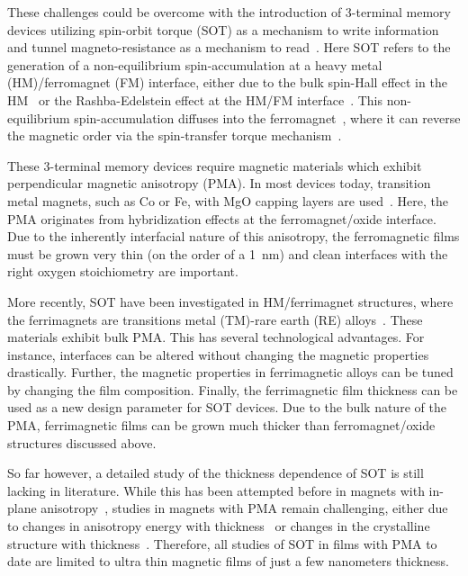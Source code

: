 \documentclass[aps,prb,superscriptaddress,sd,reprint]{revtex4-1}
\begin{document}
These challenges could be overcome with the introduction of 3-terminal memory devices utilizing spin-orbit torque (SOT) as a mechanism to write information and tunnel magneto-resistance as a mechanism to read~\cite{Lee2016}. Here SOT refers to the generation of a non-equilibrium spin-accumulation at a heavy metal (HM)/ferromagnet (FM) interface, either due to the bulk spin-Hall effect in the HM~\cite{Liu2012a,Liu2012b} or the Rashba-Edelstein effect at the HM/FM interface~\cite{Miron2011}. This non-equilibrium spin-accumulation diffuses into the ferromagnet~\cite{Hane2013}, where it can reverse the magnetic order via the spin-transfer torque mechanism~\cite{Berger1996,Slonczewski1996}.

These 3-terminal memory devices require magnetic materials which exhibit perpendicular magnetic anisotropy (PMA). In most devices today, transition metal magnets, such as Co or Fe, with MgO capping layers are used~\cite{Ikeda2010}. Here, the PMA originates from hybridization effects at the ferromagnet/oxide interface\cite{Yang2011}. Due to the inherently interfacial nature of this anisotropy, the ferromagnetic films must be grown very thin (on the order of a \SI{1}{\nano\meter}) and clean interfaces with the right oxygen stoichiometry are important.

More recently, SOT have been investigated in HM/ferrimagnet structures, where the ferrimagnets are transitions metal (TM)-rare earth (RE) alloys~\cite{Zhao2015,Ueda2016,Roschewsky2016,Finley2016}. These materials exhibit bulk PMA. This has several technological advantages. For instance, interfaces can be altered without changing the magnetic properties drastically. Further, the magnetic properties in ferrimagnetic alloys can be tuned by changing the film composition. Finally, the ferrimagnetic film thickness can be used as a new design parameter for SOT devices. Due to the bulk nature of the PMA, ferrimagnetic films can be grown much thicker than ferromagnet/oxide structures discussed above.

So far however, a detailed study of the thickness dependence of SOT is still lacking in literature. While this has been attempted before in magnets with in-plane anisotropy~\cite{Fan2014}, studies in magnets with PMA  remain challenging, either due to changes in anisotropy energy with thickness~\cite{Conte2016} or changes in the crystalline structure with thickness~\cite{Lee2014}. Therefore, all studies of SOT in films with PMA to date are limited to ultra thin magnetic films of just a few nanometers thickness.
\end{document}
